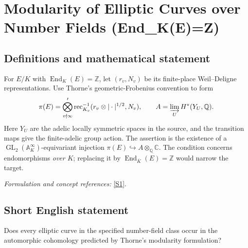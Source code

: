 \documentclass[11pt,a4paper]{article}
\newcommand{\Z}{\mathbb{Z}}
\newcommand{\Q}{\mathbb{Q}}
\newcommand{\C}{\mathbb{C}}
\newcommand{\A}{\mathbb{A}}
\newcommand{\sref}[2]{\hyperlink{source:#1:#2}{[S#2]}}
\newif\ifshowcatalogue
\newcommand{\cataloguescope}[1]{\ifshowcatalogue
 \paragraph{Exact scope in the supplied catalogue.}
 \begin{quote}\small #1\end{quote}\fi}
\numberwithin{equation}{section}
\begin{document}
\setcounter{section}{38}
\clearpage
\section{\texorpdfstring{Modularity of Elliptic Curves over Number Fields (End\_K(E)=Z)}{Modularity of Elliptic Curves over Number Fields (End\_K(E)=Z)}}\label{39}
\subsection{Definitions and mathematical statement}
For $E/K$ with $\operatorname{End}_K(E)=\Z$, let $(r_v,N_v)$ be its finite-place Weil--Deligne representations. Use Thorne's geometric-Frobenius convention to form
\[
 \pi(E)=\bigotimes_{v\nmid\infty}'
 \operatorname{rec}_{K_v}^{-1}(r_v\otimes|\cdot|^{1/2},N_v),\qquad
 A=\varinjlim_U H^*(Y_U,\Q).
\]
Here $Y_U$ are the adelic locally symmetric spaces in the source, and the transition maps give the finite-adelic group action. The assertion is the existence of a $\operatorname{GL}_2(\A_K^\infty)$-equivariant injection $\pi(E)\hookrightarrow A\otimes_{\Q}\C$. The condition concerns endomorphisms \emph{over $K$}; replacing it by $\operatorname{End}_{\bar K}(E)=\Z$ would narrow the target.
\par\smallskip\textit{Formulation and concept references:} \sref{39}{1}.
\cataloguescope{For every number field K and every elliptic curve E/K with End\_K(E)=Z, prove that pi(E) admits a GL\_2(A\_K\textasciicircum{}infinity)-equivariant injection into A tensor\_Q C, exactly as in Thorne's Conjecture 2.6. Here A is the direct limit over open compact U of H\textasciicircum{}*(Y\_U,Q) for the adelic locally symmetric spaces defined on page 647, and pi(E) is the restricted tensor product at all finite places v of rec\_\{K\_v\}\textasciicircum{}\{-1\}(r\_v tensor |.|\textasciicircum{}\{1/2\},N\_v), with (r\_v,N\_v) attached to E in the source's geometric-Frobenius normalization on pages 646 and 649.}
\subsection{Short English statement}
Does every elliptic curve in the specified number-field class occur in the automorphic cohomology predicted by Thorne's modularity formulation?
\end{document}
